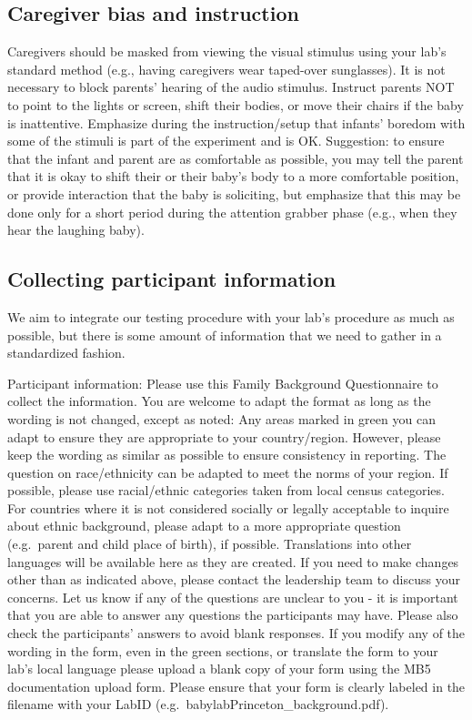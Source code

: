 \documentclass[
  letterpaper,
  DIV=11,
  numbers=noendperiod,
  oneside]{scrreprt}
\begin{document}
\subsection{Caregiver bias and
instruction}\label{caregiver-bias-and-instruction}

Caregivers should be masked from viewing the visual stimulus using your
lab's standard method (e.g., having caregivers wear taped-over
sunglasses). It is not necessary to block parents' hearing of the audio
stimulus. Instruct parents NOT to point to the lights or screen, shift
their bodies, or move their chairs if the baby is inattentive. Emphasize
during the instruction/setup that infants' boredom with some of the
stimuli is part of the experiment and is OK. Suggestion: to ensure that
the infant and parent are as comfortable as possible, you may tell the
parent that it is okay to shift their or their baby's body to a more
comfortable position, or provide interaction that the baby is
soliciting, but emphasize that this may be done only for a short period
during the attention grabber phase (e.g., when they hear the laughing
baby).

\subsection{Collecting participant
information}\label{collecting-participant-information-1}

We aim to integrate our testing procedure with your lab's procedure as
much as possible, but there is some amount of information that we need
to gather in a standardized fashion.

Participant information: Please use this Family Background Questionnaire
to collect the information. You are welcome to adapt the format as long
as the wording is not changed, except as noted: Any areas marked in
green you can adapt to ensure they are appropriate to your
country/region. However, please keep the wording as similar as possible
to ensure consistency in reporting. The question on race/ethnicity can
be adapted to meet the norms of your region. If possible, please use
racial/ethnic categories taken from local census categories. For
countries where it is not considered socially or legally acceptable to
inquire about ethnic background, please adapt to a more appropriate
question (e.g.~parent and child place of birth), if possible.
Translations into other languages will be available here as they are
created. If you need to make changes other than as indicated above,
please contact the leadership team to discuss your concerns. Let us know
if any of the questions are unclear to you - it is important that you
are able to answer any questions the participants may have. Please also
check the participants' answers to avoid blank responses. If you modify
any of the wording in the form, even in the green sections, or translate
the form to your lab's local language please upload a blank copy of your
form using the MB5 documentation upload form. Please ensure that your
form is clearly labeled in the filename with your LabID
(e.g.~babylabPrinceton\_background.pdf).
\end{document}
